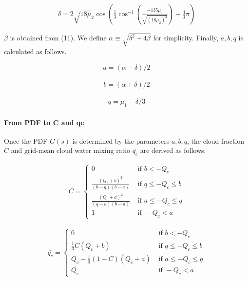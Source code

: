 \begin{eqnarray}
\delta=2 \sqrt{18 \mu_{2}} \cos \left(\frac{1}{3} \cos ^{-1}\left(\frac{-135 \mu_{3}}{\sqrt{\left(18 \mu_{2}\right)^{3}}}\right)+\frac{4}{3} \pi\right)
\end{eqnarray}

\(\beta\) is obtained from (11). We define
\(\alpha \equiv\sqrt{\delta^{2}+4 \beta}\) for simplicity. Finally,
\(a,b,q\) is calculated as follows.

\begin{eqnarray}
a=(\alpha-\delta) / 2
\end{eqnarray}

\begin{eqnarray}
b=(\alpha+\delta) / 2
\end{eqnarray}

\begin{eqnarray}
q=\mu_{1}-\delta / 3
\end{eqnarray}

\hypertarget{from-pdf-to-c-and-qc}{%
\paragraph{From PDF to C and qc}\label{from-pdf-to-c-and-qc}}

Once the PDF \(G(s)\) is determined by the parameters \(a,b,q\), the
cloud fraction \(C\) and grid-mean cloud water mixing ratio
\(\bar{q_c}\) are derived as follows.

\begin{eqnarray}
C=\left\{\begin{array}{ll}
0 & \text { if } b<-Q_{c} \\
\frac{\left(Q_{c}+b\right)^{2}}{(b-q)(b-a)} & \text { if } q \leq-Q_{c} \leq b \\
\frac{\left(Q_{c}+a\right)^{2}}{(q-a)(b-a)} & \text { if } a \leq-Q_{c} \leq q \\
1 & \text { if }-Q_{c}<a
\end{array}\right.
\label{E08-15}
\end{eqnarray}

\begin{eqnarray}
\bar{q_c}=\left\{\begin{array}{ll}
0 & \text { if } b<-Q_{c} \\
\frac{1}{3} C\left(Q_{c}+b\right) & \text { if } q \leq-Q_{c} \leq b \\
Q_{c}-\frac{1}{3}(1-C)\left(Q_{c}+a\right) & \text { if } a \leq-Q_{c} \leq q \\
Q_{c} & \text { if }-Q_{c}<a
\end{array}\right.
\label{E08-16}
\end{eqnarray}

